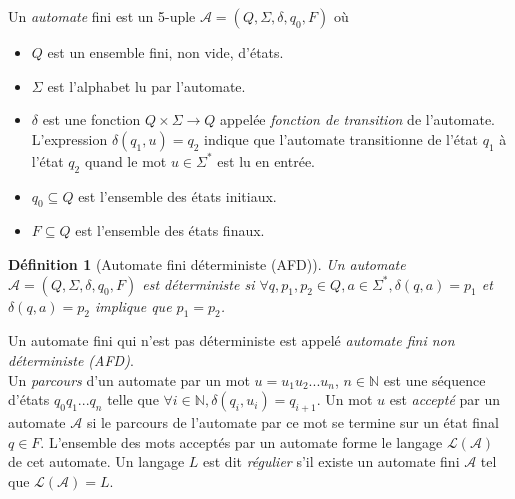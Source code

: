 \documentclass[12pt,a4paper,oneside,titlepage]{report}
\newtheorem{defi}{D\'efinition}[section]
\begin{document}
\noindent Un \emph{automate} fini est un 5-uple $\mathcal{A}=(Q,\Sigma,\delta,q_0,F)$ où 
\begin{itemize}
	\item $Q$ est un ensemble fini, non vide, d'états.
	\item $\Sigma$ est l'alphabet lu par l'automate.
	\item $\delta$ est une fonction $Q\times\Sigma\to Q$ appelée \emph{fonction de transition} de l'automate. L'expression $\delta(q_1,u)=q_2$ indique que l'automate transitionne de l'état $q_1$ à l'état $q_2$ quand le mot $u\in\Sigma^*$ est lu en entrée.
	\item $q_0\subseteq Q$ est l'ensemble des états initiaux.
	\item $F\subseteq Q$ est l'ensemble des états finaux.
\end{itemize}
\begin{defi}[Automate fini déterministe (AFD)]
\label{deter}
Un automate $\mathcal{A}=(Q,\Sigma,\delta,q_0,F)$ est \emph{déterministe} si $\forall q,p_1,p_2\in Q, a\in\Sigma^*, \delta(q,a)=p_1$ et $\delta(q,a)=p_2$ implique que $p_1=p_2$.
\end{defi}
Un automate fini qui n'est pas déterministe est appelé \emph{automate fini non déterministe (AFD)}.\\

\noindent Un \emph{parcours} d'un automate par un mot $u=u_1u_2...u_n$, $n\in\mathbb{N}$ est une séquence d'états $q_0q_1...q_n$ telle que $\forall i\in\mathbb{N}, \delta(q_i,u_i)=q_{i+1}$. Un mot $u$ est \emph{accepté} par un automate $\mathcal{A}$ si le parcours de l'automate par ce mot se termine sur un état final $q\in F$. L'ensemble des mots acceptés par un automate forme le langage $\mathcal{L}(\mathcal{A})$ de cet automate. Un langage $L$ est dit \emph{régulier} s'il existe un automate fini $\mathcal{A}$ tel que $\mathcal{L}(\mathcal{A})=L$.\\
\end{document}
